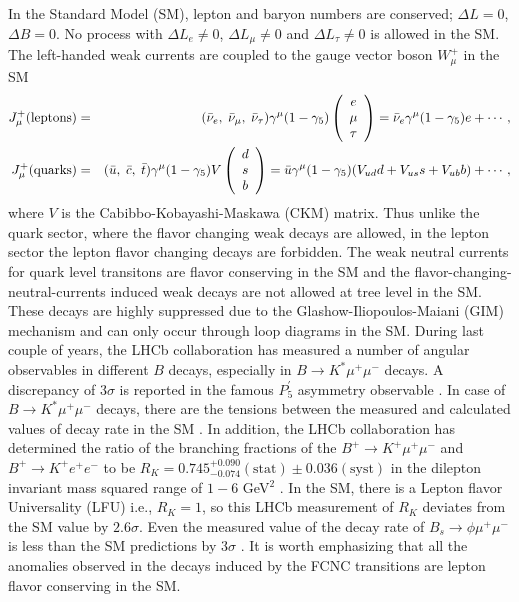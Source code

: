 \documentclass{ws-ijmpa}
\begin{document}
In the Standard Model (SM), lepton and baryon numbers are conserved; $\Delta L = 0$, $\Delta B = 0$. No process with $\Delta L_{e} \neq 0$, $\Delta L_{\mu} \neq 0$ and $\Delta L_{\tau} \neq 0$ is allowed in the SM. The left-handed weak currents are coupled to the gauge vector boson $W^{+}_{\mu}$ in the SM
\begin{eqnarray}
J^{+}_{\mu}(\text{leptons}) &=& (\bar{\nu}_e,\; \bar{\nu}_{\mu},\; \bar{\nu}_{\tau})\gamma^{\mu}(1-\gamma_{5})\left(\begin{array}{c}e\\\mu\\\tau\end{array}\right)= \bar{\nu}_e \gamma^{\mu}(1-\gamma_{5})e+\cdots ,\notag \\
J^{+}_{\mu}(\text{quarks}) &=& (\bar{u},\; \bar{c},\; \bar{t})\gamma^{\mu}(1-\gamma_{5})V\left(\begin{array}{c}d\\s\\b\end{array}\right)=\bar{u}\gamma^{\mu}(1-\gamma_{5})(V_{ud}d + V_{us}s + V_{ub}b)+\cdots , \notag
\end{eqnarray}
where $V$ is the Cabibbo-Kobayashi-Maskawa (CKM) matrix. Thus unlike the quark sector, where the flavor changing weak decays are allowed, in the lepton sector the lepton flavor changing decays are forbidden. The weak neutral currents for quark level transitons are  flavor conserving in the SM and the flavor-changing-neutral-currents 
induced weak decays are not allowed at tree level in the SM. These decays are
highly suppressed due to the Glashow-Iliopoulos-Maiani (GIM) mechanism and can only occur through loop diagrams in the SM. During last couple of years, the LHCb collaboration has measured a number of angular observables in different $B$ decays, especially in $B \to K^{*}\mu^{+}\mu^{-}$ decays. A discrepancy of $3\sigma$ is reported in the famous $P^{\prime}_5$ asymmetry observable \cite{P51,P52}. In case of $B \to K^{*}\mu^{+}\mu^{-}$ decays, there are the tensions between the measured and calculated values of decay rate in the SM \cite{Drate}. In addition, the LHCb collaboration has determined the ratio of the branching fractions of the $B^{+} \to K^{+} \mu^{+} \mu^{-}$ and  $B^{+} \to K^{+} e^{+} e^{-}$ to be $R_{K} = 0.745^{+0.090}_{-0.074}(\text{stat}) \pm 0.036(\text{syst})$ in the dilepton invariant mass squared range of $1 - 6$ GeV$^2$ \cite{LFU1,LFU2}. In the SM, there is a Lepton flavor Universality (LFU) i.e., $R_{K} = 1$, so this LHCb measurement of $R_{K}$ deviates from the SM value by $2.6\sigma$. Even the measured value of the decay rate of $B_{s}\to \phi \mu^{+}\mu^{-}$ is less than the SM predictions by $3\sigma$ \cite{Drate2}. It is worth emphasizing that all the anomalies observed in the decays induced by the FCNC transitions are lepton flavor conserving in the SM.
\end{document}
